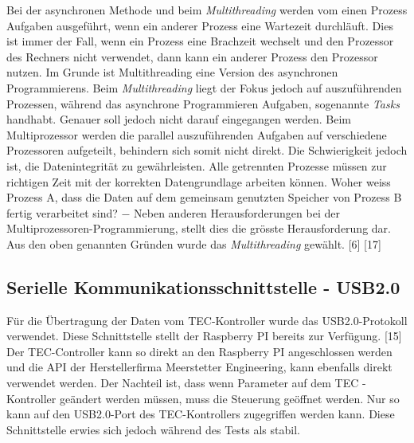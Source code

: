 Bei der asynchronen Methode und beim \textit{Multithreading} werden vom einen Prozess Aufgaben ausgeführt, wenn ein anderer Prozess eine Wartezeit durchläuft. Dies ist immer der Fall, wenn ein Prozess eine Brachzeit wechselt und  den Prozessor des Rechners nicht verwendet, dann kann ein anderer Prozess den Prozessor nutzen. Im Grunde ist Multithreading eine Version des asynchronen Programmierens. Beim \textit{Multithreading} liegt der Fokus jedoch auf auszuführenden Prozessen, während das asynchrone Programmieren Aufgaben, sogenannte \textit{Tasks} handhabt. Genauer soll jedoch nicht darauf eingegangen werden. Beim Multiprozessor werden die parallel auszuführenden Aufgaben auf verschiedene Prozessoren aufgeteilt, behindern sich somit nicht direkt. Die Schwierigkeit jedoch ist, die Datenintegrität zu gewährleisten. Alle getrennten Prozesse müssen zur richtigen Zeit mit der korrekten Datengrundlage arbeiten können. Woher weiss Prozess A, dass die Daten auf dem gemeinsam genutzten Speicher von Prozess B fertig verarbeitet sind? $-$ Neben anderen Herausforderungen bei der Multiprozessoren-Programmierung, stellt dies die grösste Herausforderung dar. Aus den oben genannten Gründen wurde das \textit{Multithreading} gewählt. [6] [17]


\subsection{Serielle Kommunikationsschnittstelle - USB2.0}
Für die Übertragung der Daten vom TEC-Kontroller wurde das USB2.0-Protokoll verwendet. Diese Schnittstelle stellt der Raspberry PI bereits zur Verfügung. [15] Der TEC-Controller kann so direkt an den Raspberry PI angeschlossen werden und die API der Herstellerfirma Meerstetter Engineering, kann ebenfalls direkt verwendet werden. Der Nachteil ist, dass wenn Parameter auf dem TEC -Kontroller geändert werden müssen, muss die Steuerung geöffnet werden. Nur so kann auf den USB2.0-Port des TEC-Kontrollers zugegriffen werden kann. Diese Schnittstelle erwies sich jedoch während des Tests als stabil.

\nocite{*}